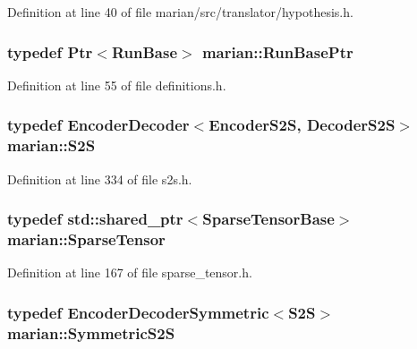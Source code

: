 Definition at line 40 of file marian/src/translator/hypothesis.\+h.

\subsubsection[{\texorpdfstring{Run\+Base\+Ptr}{RunBasePtr}}]{\setlength{\rightskip}{0pt plus 5cm}typedef {\bf Ptr}$<$Run\+Base$>$ {\bf marian\+::\+Run\+Base\+Ptr}}\hypertarget{namespacemarian_a0b57f584ee553f4bbacf654ce953f1a5}{}\label{namespacemarian_a0b57f584ee553f4bbacf654ce953f1a5}


Definition at line 55 of file definitions.\+h.

\subsubsection[{\texorpdfstring{S2S}{S2S}}]{\setlength{\rightskip}{0pt plus 5cm}typedef {\bf Encoder\+Decoder}$<${\bf Encoder\+S2S}, {\bf Decoder\+S2S}$>$ {\bf marian\+::\+S2S}}\hypertarget{namespacemarian_a83eeb152f60aff415a60e0bde62fcb85}{}\label{namespacemarian_a83eeb152f60aff415a60e0bde62fcb85}


Definition at line 334 of file s2s.\+h.

\subsubsection[{\texorpdfstring{Sparse\+Tensor}{SparseTensor}}]{\setlength{\rightskip}{0pt plus 5cm}typedef std\+::shared\+\_\+ptr$<${\bf Sparse\+Tensor\+Base}$>$ {\bf marian\+::\+Sparse\+Tensor}}\hypertarget{namespacemarian_a5484064f1fce2661d0b27a5c02a9392b}{}\label{namespacemarian_a5484064f1fce2661d0b27a5c02a9392b}


Definition at line 167 of file sparse\+\_\+tensor.\+h.

\subsubsection[{\texorpdfstring{Symmetric\+S2S}{SymmetricS2S}}]{\setlength{\rightskip}{0pt plus 5cm}typedef {\bf Encoder\+Decoder\+Symmetric}$<${\bf S2S}$>$ {\bf marian\+::\+Symmetric\+S2S}}\hypertarget{namespacemarian_a48b010253fa71c5bcb6f5016662d5ff6}{}\label{namespacemarian_a48b010253fa71c5bcb6f5016662d5ff6}


